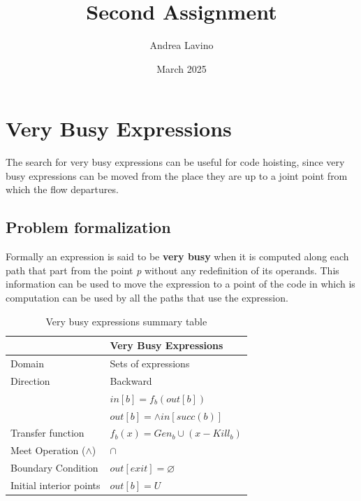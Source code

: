 \documentclass{article}
\title{Second Assignment}
\author{Andrea Lavino}
\date{March 2025}
\begin{document}
\maketitle

\clearpage

\tableofcontents

\clearpage

\section{Very Busy Expressions}

The search for very busy expressions can be useful for code hoisting, since very busy expressions can be moved from the place they are up to a joint point from which the flow departures.

\subsection{Problem formalization}

Formally an expression is said to be \textbf{very busy} when it is computed along each path that part from the point \textit{p} without any redefinition of its operands. This information can be used to move the expression to a point of the code in which is computation can be used by all the paths that use the expression.

\begin{table}[H]
	\centering
	\begin{tabular}{|p{}|p{}|}
		\hline
		                          & \textbf{Very Busy Expressions}     \\
		\hline
		Domain                    & Sets of expressions                \\
		\hline
		Direction                 & Backward                           \\
		                          & $in[b] = f_b(out[b])$              \\
		                          & $out[b] = \wedge in[succ(b)]$      \\
		\hline
		Transfer function         & $f_b(x) = Gen_b \cup (x - Kill_b)$ \\
		\hline
		Meet Operation ($\wedge$) & $\cap$                             \\
		\hline
		Boundary Condition        & $out[exit] = \varnothing$          \\
		\hline
		Initial interior points   & $out[b] = U$                       \\
		\hline
	\end{tabular}
	\caption{Very busy expressions summary table}
	\label{tab:dataflow_problem_x}
\end{table}
\end{document}
